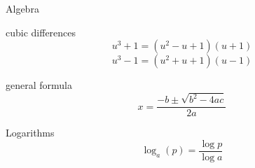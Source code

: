 \begin{section}{Algebra}
	\begin{subsection}{cubic differences}
	$$u^3 + 1 = (u^2-u+1)(u+1)$$
	$$u^3 - 1 = (u^2+u+1)(u-1)$$
	\end{subsection}

	\begin{subsection}{general formula}
		$$x= \frac{ -b \pm \sqrt{b^2 - 4ac}}{2a}$$
	\end{subsection}

	\begin{subsection}{Logarithms}
		$$\log_a (p) = \frac{ \log p } {\log a } $$
	\end{subsection}

\end{section}
